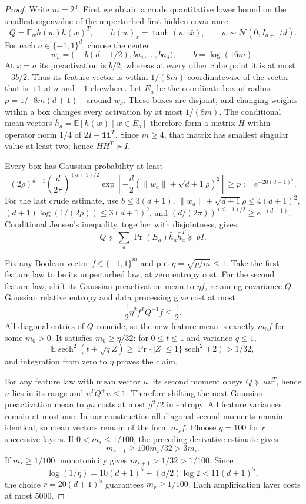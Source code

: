 \begin{proof}
Write $m=2^d$. First we obtain a crude quantitative lower bound on the
smallest eigenvalue of the unperturbed first hidden covariance
\[
 Q=\mathbb E_w h(w)h(w)^T,\qquad
 h(w)_x=\tanh(w\cdot\bar x),\qquad
 w\sim\mathcal N(0,I_{d+1}/d).
\]
For each $a\in\{-1,1\}^d$, choose the center
\[
 w_a=\bigl(-b(d-1/2),ba_1,\ldots,ba_d\bigr),
 \qquad b=\log(16m).
\]
At $x=a$ its preactivation is $b/2$, whereas at every other cube point
it is at most $-3b/2$. Thus its feature vector is within $1/(8m)$
coordinatewise of the vector that is $+1$ at $a$ and $-1$ elsewhere.
Let $E_a$ be the coordinate box of radius
$\rho=1/[8m(d+1)]$ around $w_a$. These boxes are disjoint, and changing
weights within a box changes every activation by at most $1/(8m)$.
The conditional mean vectors
$\bar h_a=\mathbb E[h(w)\mid w\in E_a]$ therefore form a matrix
$H$ within operator norm $1/4$ of $2I-\boldsymbol1\boldsymbol1^T$.
Since $m\ge4$, that matrix has smallest singular value at least two;
hence $HH^T\succeq I$.

Every box has Gaussian probability at least
\[
 (2\rho)^{d+1}\left(\frac d{2\pi}\right)^{(d+1)/2}
 \exp\left[-\frac d2
       (\|w_a\|+\sqrt{d+1}\rho)^2\right]
 \ge p:=e^{-20(d+1)^5}.
\]
For the last crude estimate, use
$b\le3(d+1)$, $\|w_a\|+\sqrt{d+1}\rho\le4(d+1)^2$,
$(d+1)\log(1/(2\rho))\le3(d+1)^2$, and
$(d/(2\pi))^{(d+1)/2}\ge e^{-(d+1)}$.
Conditional Jensen's inequality, together with disjointness, gives
\[
 Q\succeq\sum_a\Pr(E_a)\bar h_a\bar h_a^T\succeq pI.
\]

Fix any Boolean vector $f\in\{-1,1\}^m$ and put
$\eta=\sqrt{p/m}\le1$. Take the first feature law to be its
unperturbed law, at zero entropy cost. For the second feature law,
shift its Gaussian preactivation mean to $\eta f$, retaining covariance
$Q$. Gaussian relative entropy and data processing give cost at most
\[
 \frac12\eta^2 f^TQ^{-1}f\le\frac12.
\]
All diagonal entries of $Q$ coincide, so the new feature mean is
exactly $m_0f$ for some $m_0>0$. It satisfies $m_0\ge\eta/32$:
for $0\le t\le1$ and variance $q\le1$,
\[
 \mathbb E\operatorname{sech}^2(t+\sqrt qZ)
 \ge\Pr\{|Z|\le1\}\operatorname{sech}^2(2)>1/32,
\]
and integration from zero to $\eta$ proves the claim.

For any feature law with mean vector $u$, its second moment obeys
$Q\succeq uu^T$, hence $u$ lies in its range and $u^TQ^+u\le1$.
Therefore shifting the next Gaussian preactivation mean to $g u$
costs at most $g^2/2$ in entropy. All feature variances remain at most
one. In our construction all diagonal second moments remain identical,
so mean vectors remain of the form $m_sf$.
Choose $g=100$ for $r$ successive layers. If $0<m_s\le1/100$, the
preceding derivative estimate gives
\[
 m_{s+1}\ge100m_s/32>3m_s.
\]
If $m_s\ge1/100$, monotonicity gives $m_{s+1}>1/32>1/100$.
Since
\[
 \log(1/\eta)=10(d+1)^5+(d/2)\log2<11(d+1)^5,
\]
the choice $r=20(d+1)^5$ guarantees $m_r\ge1/100$.
Each amplification layer costs at most $5000$.


\end{proof}
